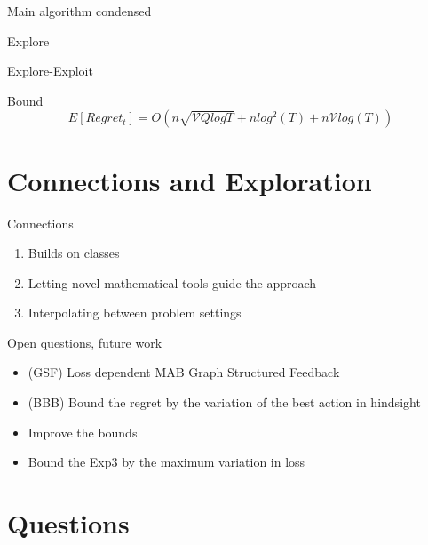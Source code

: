 \documentclass{beamer}
\begin{document}
\begin{frame}{Main algorithm condensed}
  
\end{frame}

\begin{frame}{Explore}
  
\end{frame}
\begin{frame}{Explore-Exploit}
  
\end{frame}


\begin{frame}{Bound}
  \begin{equation}
    E[Regret_t] = O(n \sqrt{\mathcal{V}Q log T} + n log^2(T) + n \mathcal{V}log(T))
  \end{equation}
\end{frame}

\section{Connections and Exploration}
\begin{frame}{Connections}
  \begin{enumerate}
  \item
    Builds on classes
  \item
    Letting novel mathematical tools guide the approach
  \item 
    Interpolating between problem settings
  \end{enumerate}
\end{frame}

\begin{frame}{Open questions, future work}
  \begin{itemize}
    \item (GSF) Loss dependent MAB Graph Structured Feedback
    \item (BBB) Bound the regret by the variation of the best action in hindsight
    \item Improve the bounds
    \item Bound the Exp3 by the maximum variation in loss
  \end{itemize}
\end{frame}

\section{Questions}
\end{document}
